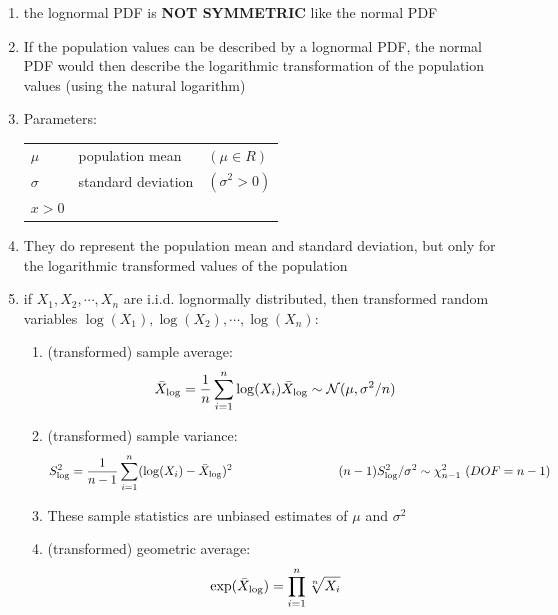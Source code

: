 \begin{enumerate}[itemsep=0.2cm]
    \item the lognormal PDF is \textbf{NOT SYMMETRIC} like the normal PDF 

    \item If the population values can be described by a lognormal PDF, the normal PDF would then describe the logarithmic transformation of the population values (using the natural logarithm)

    \item Parameters:
    \begin{table}[H]
        \centering
        \begin{tabular}{l l l}
            $\mu$ & population mean   & $(\mu \in R)$ \\
            
            $\sigma$ & standard deviation &   $(\sigma^2 > 0)$ \\
            
            $x > 0$ & & \\

        \end{tabular}
    \end{table}

    \item They do represent the population mean and standard deviation, but only for the logarithmic transformed values of the population

    \item if $X_1, X_2,\cdots, X_n$ are i.i.d. lognormally distributed, then transformed random variables $\log(X_1), \log(X_2),\cdots, \log(X_n)$:
    \begin{enumerate}[itemsep=0.2cm]
        \item (transformed) sample average:
        \[
            \bar{X}_{\log} = \dfrac{1}{n} \dsum_{i=1}^n \log(X_i)
            \hfill
            \bar{X}_{\log} \sim \mathcal{N}(\mu, \sigma^2/n)
        \]

        \item (transformed) sample variance:
        \[
            S_{\log}^2 = \dfrac{1}{n-1} \dsum_{i=1}^n (\log(X_i) - \bar{X}_{\log})^2
            \hspace{3cm}
            (n-1)S_{\log}^2/\sigma^2 \sim \chi_{n-1}^2
            \ (DOF=n-1)
        \]

        \item These sample statistics are unbiased estimates of $\mu$ and $\sigma^2$

        \item (transformed) geometric average:
        \[
            \exp(\bar{X}_{\log}) = \displaystyle\prod_{i=1}^n \sqrt[n]{X_i}
        \]

    \end{enumerate}

\end{enumerate}


